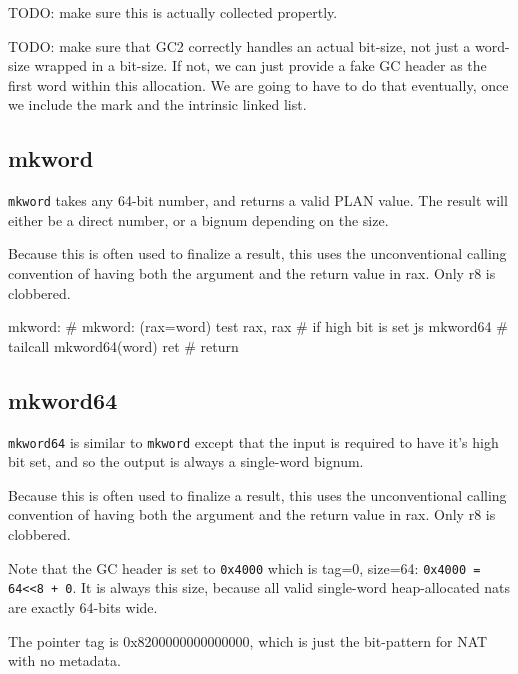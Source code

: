 TODO: make sure this is actually collected propertly.

TODO: make sure that GC2 correctly handles an actual bit-size, not just
a word-size wrapped in a bit-size.  If not, we can just provide a fake
GC header as the first word within this allocation.  We are going to
have to do that eventually, once we include the mark and the intrinsic
linked list.

\subsection{mkword}

\lstinline|mkword| takes any 64-bit number, and returns a valid PLAN
value.  The result will either be a direct number, or a bignum depending
on the size.

Because this is often used to finalize a result, this uses the
unconventional calling convention of having both the argument and the
return value in rax.  Only r8 is clobbered.

\begin{asm}
mkword:                                     # mkword: (rax=word)
	test	rax, rax                    #   if high bit is set
	js	mkword64                    #     tailcall mkword64(word)
	ret                                 #   return
\end{asm}

\subsection{mkword64}

\lstinline|mkword64| is similar to \lstinline|mkword| except that the
input is required to have it's high bit set, and so the output is always
a single-word bignum.

Because this is often used to finalize a result, this uses the
unconventional calling convention of having both the argument and the
return value in rax.  Only r8 is clobbered.

Note that the GC header is set to \lstinline|0x4000| which is tag=0,
size=64: \lstinline|0x4000 = 64<<8 + 0|.  It is always this size, because
all valid single-word heap-allocated nats are exactly 64-bits wide.

The pointer tag is 0x8200000000000000, which is just the bit-pattern
for NAT with no metadata.

